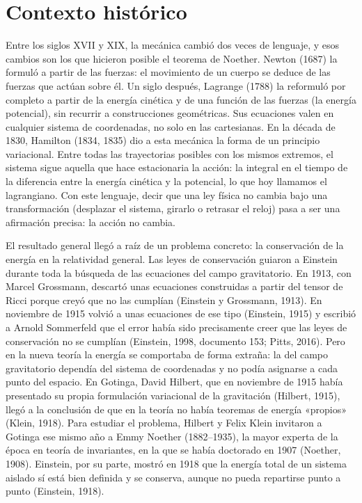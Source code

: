\documentclass[11pt,a4paper,spanish]{book}
\begin{document}
\section{Contexto histórico}\label{contexto-histuxf3rico}

Entre los siglos XVII y XIX, la mecánica cambió dos veces de lenguaje, y
esos cambios son los que hicieron posible el teorema de Noether. Newton
(1687) la formuló a partir de las fuerzas: el movimiento de un cuerpo se
deduce de las fuerzas que actúan sobre él. Un siglo después, Lagrange
(1788) la reformuló por completo a partir de la energía cinética y de
una función de las fuerzas (la energía potencial), sin recurrir a
construcciones geométricas. Sus ecuaciones valen en cualquier sistema de
coordenadas, no solo en las cartesianas. En la década de 1830, Hamilton
(1834, 1835) dio a esta mecánica la forma de un principio variacional.
Entre todas las trayectorias posibles con los mismos extremos, el
sistema sigue aquella que hace estacionaria la acción: la integral en el
tiempo de la diferencia entre la energía cinética y la potencial, lo que
hoy llamamos el lagrangiano. Con este lenguaje, decir que una ley física
no cambia bajo una transformación (desplazar el sistema, girarlo o
retrasar el reloj) pasa a ser una afirmación precisa: la acción no
cambia.

El resultado general llegó a raíz de un problema concreto: la
conservación de la energía en la relatividad general. Las leyes de
conservación guiaron a Einstein durante toda la búsqueda de las
ecuaciones del campo gravitatorio. En 1913, con Marcel Grossmann,
descartó unas ecuaciones construidas a partir del tensor de Ricci porque
creyó que no las cumplían (Einstein y Grossmann, 1913). En noviembre de
1915 volvió a unas ecuaciones de ese tipo (Einstein, 1915) y escribió a
Arnold Sommerfeld que el error había sido precisamente creer que las
leyes de conservación no se cumplían (Einstein, 1998, documento 153;
Pitts, 2016). Pero en la nueva teoría la energía se comportaba de forma
extraña: la del campo gravitatorio dependía del sistema de coordenadas y
no podía asignarse a cada punto del espacio. En Gotinga, David Hilbert,
que en noviembre de 1915 había presentado su propia formulación
variacional de la gravitación (Hilbert, 1915), llegó a la conclusión de
que en la teoría no había teoremas de energía «propios» (Klein, 1918).
Para estudiar el problema, Hilbert y Felix Klein invitaron a Gotinga ese
mismo año a Emmy Noether (1882--1935), la mayor experta de la época en
teoría de invariantes, en la que se había doctorado en 1907 (Noether,
1908). Einstein, por su parte, mostró en 1918 que la energía total de un
sistema aislado sí está bien definida y se conserva, aunque no pueda
repartirse punto a punto (Einstein, 1918).
\end{document}
